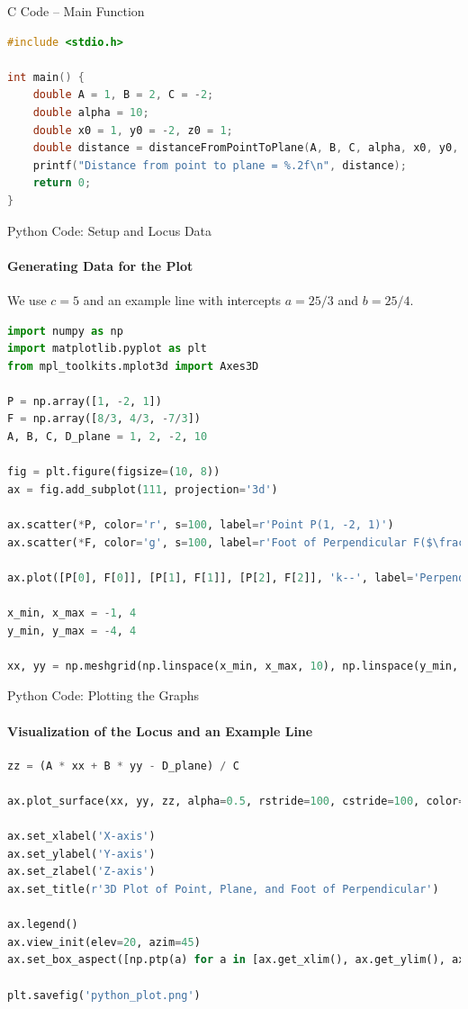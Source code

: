 \documentclass{beamer}
\begin{document}
\begin{frame}[fragile]{C Code – Main Function}
\begin{lstlisting}[language=C]
#include <stdio.h>

int main() {
    double A = 1, B = 2, C = -2;
    double alpha = 10;
    double x0 = 1, y0 = -2, z0 = 1;
    double distance = distanceFromPointToPlane(A, B, C, alpha, x0, y0, z0);
    printf("Distance from point to plane = %.2f\n", distance);
    return 0;
}
\end{lstlisting}
\end{frame}

\begin{frame}[fragile]{Python Code: Setup and Locus Data}
    \framesubtitle{Generating Data for the Plot}
    
    We use $c=5$ and an example line with intercepts $a=25/3$ and $b=25/4$.
    
    \lstset{style=PythonStyle}
    \begin{lstlisting}[language=Python]
import numpy as np
import matplotlib.pyplot as plt
from mpl_toolkits.mplot3d import Axes3D

P = np.array([1, -2, 1])
F = np.array([8/3, 4/3, -7/3])
A, B, C, D_plane = 1, 2, -2, 10

fig = plt.figure(figsize=(10, 8))
ax = fig.add_subplot(111, projection='3d')

ax.scatter(*P, color='r', s=100, label=r'Point P(1, -2, 1)')
ax.scatter(*F, color='g', s=100, label=r'Foot of Perpendicular F($\frac{8}{3}, \frac{4}{3}, -\frac{7}{3}$)')

ax.plot([P[0], F[0]], [P[1], F[1]], [P[2], F[2]], 'k--', label='Perpendicular Line PF')

x_min, x_max = -1, 4
y_min, y_max = -4, 4

xx, yy = np.meshgrid(np.linspace(x_min, x_max, 10), np.linspace(y_min, y_max, 10))
    \end{lstlisting}
\end{frame}

\begin{frame}[fragile]{Python Code: Plotting the Graphs}
    \framesubtitle{Visualization of the Locus and an Example Line}
    
    \lstset{style=PythonStyle}
    \begin{lstlisting}[language=Python]
zz = (A * xx + B * yy - D_plane) / C

ax.plot_surface(xx, yy, zz, alpha=0.5, rstride=100, cstride=100, color='c')

ax.set_xlabel('X-axis')
ax.set_ylabel('Y-axis')
ax.set_zlabel('Z-axis')
ax.set_title(r'3D Plot of Point, Plane, and Foot of Perpendicular')

ax.legend()
ax.view_init(elev=20, azim=45)
ax.set_box_aspect([np.ptp(a) for a in [ax.get_xlim(), ax.get_ylim(), ax.get_zlim()]]) 

plt.savefig('python_plot.png')
    \end{lstlisting}
\end{frame}
\end{document}
